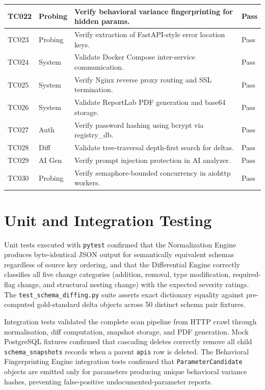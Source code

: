 \documentclass{fisatprojectfinal}
\begin{document}
\begin{longtable}{|p{2cm}|p{3cm}|p{6cm}|p{2cm}|}
TC022 & Probing & Verify behavioral variance fingerprinting for hidden params. & Pass \\ \hline
TC023 & Probing & Verify extraction of FastAPI-style error location keys. & Pass \\ \hline
TC024 & System & Validate Docker Compose inter-service communication. & Pass \\ \hline
TC025 & System & Verify Nginx reverse proxy routing and SSL termination. & Pass \\ \hline
TC026 & System & Validate ReportLab PDF generation and base64 storage. & Pass \\ \hline
TC027 & Auth & Verify password hashing using bcrypt via registry\_db. & Pass \\ \hline
TC028 & Diff & Validate tree-traversal depth-first search for deltas. & Pass \\ \hline
TC029 & AI Gen & Verify prompt injection protection in AI analyzer. & Pass \\ \hline
TC030 & Probing & Verify semaphore-bounded concurrency in aiohttp workers. & Pass \\ \hline
\end{longtable}

\section{Unit and Integration Testing}
Unit tests executed with \texttt{pytest} confirmed that the Normalization Engine produces byte-identical JSON output for semantically equivalent schemas regardless of source key ordering, and that the Differential Engine correctly classifies all five change categories (addition, removal, type modification, required-flag change, and structural nesting change) with the expected severity ratings. The \texttt{test\_schema\_diffing.py} suite asserts exact dictionary equality against pre-computed gold-standard delta objects across 50 distinct schema pair fixtures.

Integration tests validated the complete scan pipeline from HTTP crawl through normalisation, diff computation, snapshot storage, and PDF generation. Mock PostgreSQL fixtures confirmed that cascading deletes correctly remove all child \texttt{schema\_snapshots} records when a parent \texttt{apis} row is deleted. The Behavioral Fingerprinting Engine integration tests confirmed that \texttt{ParameterCandidate} objects are emitted only for parameters producing unique behavioral variance hashes, preventing false-positive undocumented-parameter reports.
\end{document}
